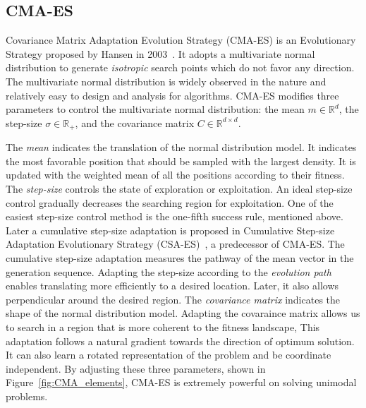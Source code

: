 \subsection{CMA-ES}
Covariance Matrix Adaptation Evolution Strategy (CMA-ES) is an Evolutionary Strategy 
proposed by Hansen in 2003~\cite{Hansen:2003:CMA_ES}.
It adopts a multivariate normal distribution to generate \textit{isotropic} search points which do not favor any direction.
The multivariate normal distribution is widely observed in the nature and relatively easy to design and analysis for algorithms.
CMA-ES modifies three parameters to control the multivariate normal distribution: 
the mean $m \in \mathbb{R}^d$, the step-size $\sigma \in \mathbb{R}_+$, and the covariance matrix $C \in \mathbb{R}^{d \times d}$.


The \textit{mean} indicates the translation of the normal distribution model.
It indicates the most favorable position that should be sampled with the largest density.
It is updated with the weighted mean of all the positions according to their fitness.
The \textit{step-size} controls the state of exploration or exploitation.
An ideal step-size control gradually decreases the searching region for exploitation.
One of the easiest step-size control method is the one-fifth success rule, mentioned above.
Later a cumulative step-size adaptation is proposed in 
Cumulative Step-size Adaptation Evolutionary Strategy (CSA-ES)~\cite{Hansen:2001:CSA_ES}, a predecessor of CMA-ES.
The cumulative step-size adaptation measures the pathway of the mean vector in the generation sequence.
Adapting the step-size according to the \textit{evolution path} enables translating more efficiently to a desired location.
Later, it also allows perpendicular around the desired region.
The \textit{covariance matrix} indicates the shape of the normal distribution model.
Adapting the covaraince matrix allows us to search in a region that is more coherent to the fitness landscape, 
This adaptation follows a natural gradient towards the direction of optimum solution.
It can also learn a rotated representation of the problem and be coordinate independent. 
By adjusting these three parameters, shown in Figure~\ref{fig:CMA_elements}, CMA-ES is extremely powerful on solving unimodal problems.

